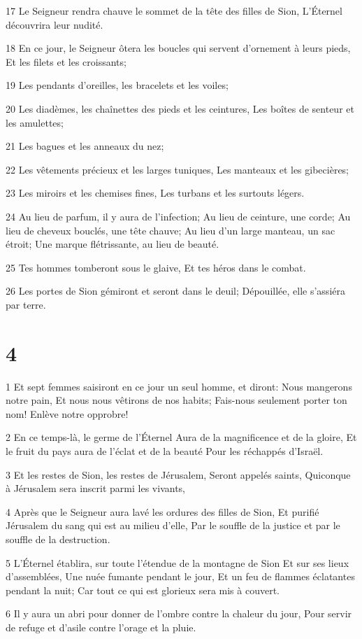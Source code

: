 \par 17 Le Seigneur rendra chauve le sommet de la tête des filles de Sion, L'Éternel découvrira leur nudité.
\par 18 En ce jour, le Seigneur ôtera les boucles qui servent d'ornement à leurs pieds, Et les filets et les croissants;
\par 19 Les pendants d'oreilles, les bracelets et les voiles;
\par 20 Les diadèmes, les chaînettes des pieds et les ceintures, Les boîtes de senteur et les amulettes;
\par 21 Les bagues et les anneaux du nez;
\par 22 Les vêtements précieux et les larges tuniques, Les manteaux et les gibecières;
\par 23 Les miroirs et les chemises fines, Les turbans et les surtouts légers.
\par 24 Au lieu de parfum, il y aura de l'infection; Au lieu de ceinture, une corde; Au lieu de cheveux bouclés, une tête chauve; Au lieu d'un large manteau, un sac étroit; Une marque flétrissante, au lieu de beauté.
\par 25 Tes hommes tomberont sous le glaive, Et tes héros dans le combat.
\par 26 Les portes de Sion gémiront et seront dans le deuil; Dépouillée, elle s'assiéra par terre.

\chapter{4}

\par 1 Et sept femmes saisiront en ce jour un seul homme, et diront: Nous mangerons notre pain, Et nous nous vêtirons de nos habits; Fais-nous seulement porter ton nom! Enlève notre opprobre!
\par 2 En ce temps-là, le germe de l'Éternel Aura de la magnificence et de la gloire, Et le fruit du pays aura de l'éclat et de la beauté Pour les réchappés d'Israël.
\par 3 Et les restes de Sion, les restes de Jérusalem, Seront appelés saints, Quiconque à Jérusalem sera inscrit parmi les vivants,
\par 4 Après que le Seigneur aura lavé les ordures des filles de Sion, Et purifié Jérusalem du sang qui est au milieu d'elle, Par le souffle de la justice et par le souffle de la destruction.
\par 5 L'Éternel établira, sur toute l'étendue de la montagne de Sion Et sur ses lieux d'assemblées, Une nuée fumante pendant le jour, Et un feu de flammes éclatantes pendant la nuit; Car tout ce qui est glorieux sera mis à couvert.
\par 6 Il y aura un abri pour donner de l'ombre contre la chaleur du jour, Pour servir de refuge et d'asile contre l'orage et la pluie.

